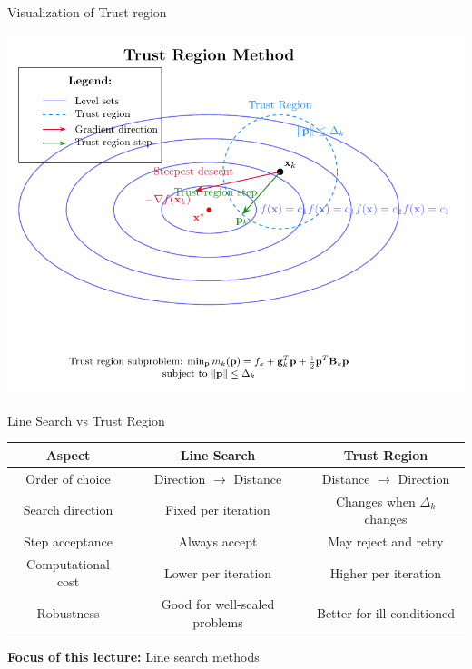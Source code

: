 \documentclass[aspectratio=1610]{beamer}
\begin{document}
\begin{frame}{Visualization of Trust region}
  \begin{center}
    \includegraphics[height=0.9\textheight]{./figures/trust_region/main.pdf}
  \end{center}
\end{frame}

\begin{frame}{Line Search vs Trust Region}
  \begin{center}
    \begin{tabular}{|c|c|c|}
      \hline
      \textbf{Aspect} & \textbf{Line Search} & \textbf{Trust Region} \\
      \hline
      \hline
      Order of choice & Direction $\rightarrow$ Distance & Distance $\rightarrow$ Direction \\
      \hline
      Search direction & Fixed per iteration & Changes when $\Delta_k$ changes \\
      \hline
      Step acceptance & Always accept & May reject and retry \\
      \hline
      Computational cost & Lower per iteration & Higher per iteration \\
      \hline
      Robustness & Good for well-scaled problems & Better for ill-conditioned \\
      \hline
    \end{tabular}
  \end{center}
  
  \vspace{0.5cm}
  
  \textbf{Focus of this lecture:} Line search methods
\end{frame}
\end{document}
